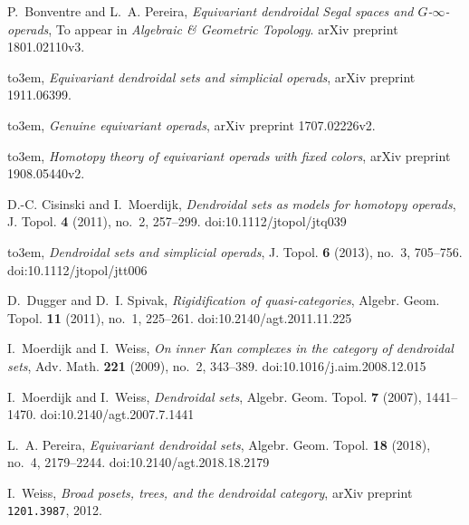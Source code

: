 \documentclass{hha}
\theoremstyle{definition} %
\begin{document}
\providecommand{\bysame}{\leavevmode\hbox to3em{\hrulefill}\thinspace}
\providecommand{\MR}{\relax\ifhmode\unskip\space\fi MR }
\providecommand{\MRhref}[2]{%
  \href{http://www.ams.org/mathscinet-getitem?mr=#1}{#2}
}
\providecommand{\doi}[1]{%
  doi:\href{https://dx.doi.org/#1}{#1}}
\providecommand{\arxiv}[1]{%
  arXiv:\href{https://arxiv.org/abs/#1}{#1}}
\providecommand{\href}[2]{#2}
\begin{thebibliography}{MW07}

P.~Bonventre and L.~A. Pereira, \emph{Equivariant dendroidal {S}egal spaces and
  {$G$-$\infty$-}operads}, To appear in \textit{Algebraic \& Geometric
  Topology}. arXiv preprint
  \href{https://arxiv.org/abs/1801.02110v3}{1801.02110v3}.

\bysame, \emph{Equivariant dendroidal sets and simplicial operads}, arXiv
  preprint \href{https://arxiv.org/abs/1911.06399}{1911.06399}.

\bysame, \emph{Genuine equivariant operads}, arXiv preprint
  \href{https://arxiv.org/abs/1707.02226v2}{1707.02226v2}.

\bysame, \emph{Homotopy theory of equivariant operads with fixed colors}, arXiv
  preprint \href{https://arxiv.org/abs/1908.05440v2}{1908.05440v2}.

D.-C. Cisinski and I.~Moerdijk, \emph{Dendroidal sets as models for homotopy
  operads}, J. Topol. \textbf{4} (2011), no.~2, 257--299.
  \doi{10.1112/jtopol/jtq039}

\bysame, \emph{Dendroidal sets and simplicial operads}, J. Topol. \textbf{6}
  (2013), no.~3, 705--756. \doi{10.1112/jtopol/jtt006}

D.~Dugger and D.~I. Spivak, \emph{Rigidification of quasi-categories}, Algebr.
  Geom. Topol. \textbf{11} (2011), no.~1, 225--261.
  \doi{10.2140/agt.2011.11.225}

I.~Moerdijk and I.~Weiss, \emph{On inner {K}an complexes in the category of
  dendroidal sets}, Adv. Math. \textbf{221} (2009), no.~2, 343--389.
  \doi{10.1016/j.aim.2008.12.015}

I.~Moerdijk and I.~Weiss, \emph{Dendroidal sets}, Algebr. Geom. Topol.
  \textbf{7} (2007), 1441--1470. \doi{10.2140/agt.2007.7.1441}

L.~A. Pereira, \emph{Equivariant dendroidal sets}, Algebr. Geom. Topol.
  \textbf{18} (2018), no.~4, 2179--2244. \doi{10.2140/agt.2018.18.2179}

I.~Weiss, \emph{Broad posets, trees, and the dendroidal category}, arXiv
  preprint \href{https://arxiv.org/abs/1201.3987}{\texttt{1201.3987}}, 2012.

\end{thebibliography}
\end{document}
